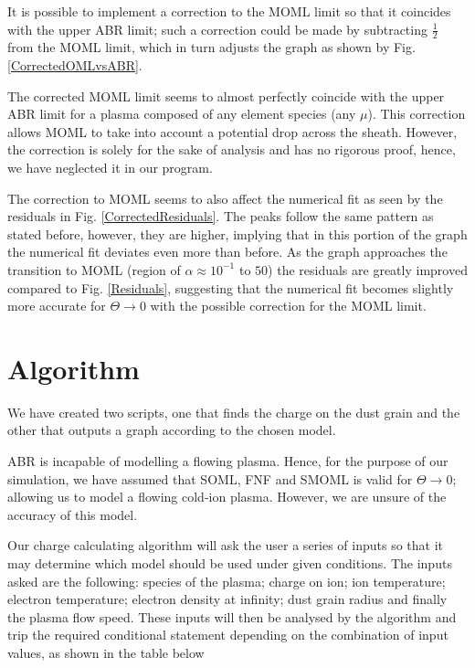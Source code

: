 \documentclass[journal]{Imperial_lab_report}
\begin{document}
It is possible to implement a correction to the MOML limit so that it coincides with the upper ABR limit; such a correction could be made by subtracting $\frac{1}{2}$ from the MOML limit, which in turn adjusts the graph as shown by Fig. \ref{CorrectedOMLvsABR}.

\smallskip

The corrected MOML limit seems to almost perfectly coincide with the upper ABR limit for a plasma composed of any element species (any $\mu$). This correction allows MOML to take into account a potential drop across the sheath. However, the correction is solely for the sake of analysis and has no rigorous proof, hence, we have neglected it in our program.

\smallskip

The correction to MOML seems to also affect the numerical fit as seen by the residuals in Fig. \ref{CorrectedResiduals}. The peaks follow the same pattern as stated before, however, they are higher, implying that in this portion of the graph the numerical fit deviates even more than before. As the graph approaches the transition to MOML (region of $\alpha \approx 10^{-1}$ to $50$) the residuals are greatly improved compared to Fig. \ref{Residuals}, suggesting that the numerical fit becomes slightly more accurate for $\Theta \xrightarrow{} 0$ with the possible correction for the MOML limit.


\section{Algorithm}

We have created two scripts, one that finds the charge on the dust grain and the other that outputs a graph according to the chosen model.

\smallskip

ABR is incapable of modelling a flowing plasma. Hence, for the purpose of our simulation, we have assumed that SOML, FNF and SMOML is valid for $\Theta \xrightarrow{} 0$; allowing us to model a flowing cold-ion plasma. However, we are unsure of the accuracy of this model.

\smallskip

Our charge calculating algorithm will ask the user a series of inputs so that it may determine which model should be used under given conditions. The inputs asked are the following: species of the plasma; charge on ion; ion temperature; electron temperature; electron density at infinity; dust grain radius and finally the plasma flow speed. These inputs will then be analysed by the algorithm and trip the required conditional statement depending on the combination of input values, as shown in the table below
\end{document}
